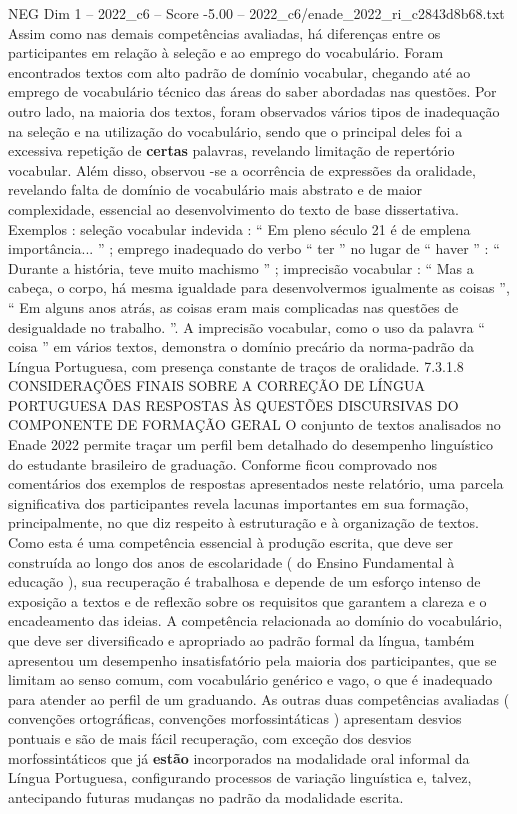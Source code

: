 \begin{textsample}{NEG Dim 1 – 2022\_c6 – Score -5.00 – 2022\_c6/enade\_2022\_ri\_c2843d8b68.txt}
Assim como nas demais competências avaliadas, há diferenças entre os participantes em relação à seleção e ao emprego do vocabulário.
Foram encontrados textos com alto padrão de domínio vocabular, chegando até ao emprego de vocabulário técnico das áreas do saber abordadas nas questões.
Por outro lado, na maioria dos textos, foram observados vários tipos de inadequação na seleção e na utilização do vocabulário, sendo que o principal deles foi a excessiva repetição de \textbf{certas} palavras, revelando limitação de repertório vocabular.
Além disso, observou -se a ocorrência de expressões da oralidade, revelando falta de domínio de vocabulário mais abstrato e de maior complexidade, essencial ao desenvolvimento do texto de base dissertativa.
Exemplos : seleção vocabular indevida : “ Em pleno século 21 é de emplena importância... ” ; emprego inadequado do verbo “ ter ” no lugar de “ haver ” : “ Durante a história, teve muito machismo ” ; imprecisão vocabular : “ Mas a cabeça, o corpo, há mesma igualdade para desenvolvermos igualmente as coisas ”, “ Em alguns anos atrás, as coisas eram mais complicadas nas questões de desigualdade no trabalho. ”.
A imprecisão vocabular, como o uso da palavra “ coisa ” em vários textos, demonstra o domínio precário da norma-padrão da Língua Portuguesa, com presença constante de traços de oralidade. 7.3.1.8 CONSIDERAÇÕES FINAIS SOBRE A CORREÇÃO DE LÍNGUA PORTUGUESA DAS RESPOSTAS ÀS QUESTÕES DISCURSIVAS DO COMPONENTE DE FORMAÇÃO GERAL O conjunto de textos analisados no Enade 2022 permite traçar um perfil bem detalhado do desempenho linguístico do estudante brasileiro de graduação.
Conforme ficou comprovado nos comentários dos exemplos de respostas apresentados neste relatório, uma parcela significativa dos participantes revela lacunas importantes em sua formação, principalmente, no que diz respeito à estruturação e à organização de textos.
Como esta é uma competência essencial à produção escrita, que deve ser construída ao longo dos anos de escolaridade ( do Ensino Fundamental à educação ), sua recuperação é trabalhosa e depende de um esforço intenso de exposição a textos e de reflexão sobre os requisitos que garantem a clareza e o encadeamento das ideias.
A competência relacionada ao domínio do vocabulário, que deve ser diversificado e apropriado ao padrão formal da língua, também apresentou um desempenho insatisfatório pela maioria dos participantes, que se limitam ao senso comum, com vocabulário genérico e vago, o que é inadequado para atender ao perfil de um graduando.
As outras duas competências avaliadas ( convenções ortográficas, convenções morfossintáticas ) apresentam desvios pontuais e são de mais fácil recuperação, com exceção dos desvios morfossintáticos que já \textbf{estão} incorporados na modalidade oral informal da Língua Portuguesa, configurando processos de variação linguística e, talvez, antecipando futuras mudanças no padrão da modalidade escrita.

\end{textsample}
